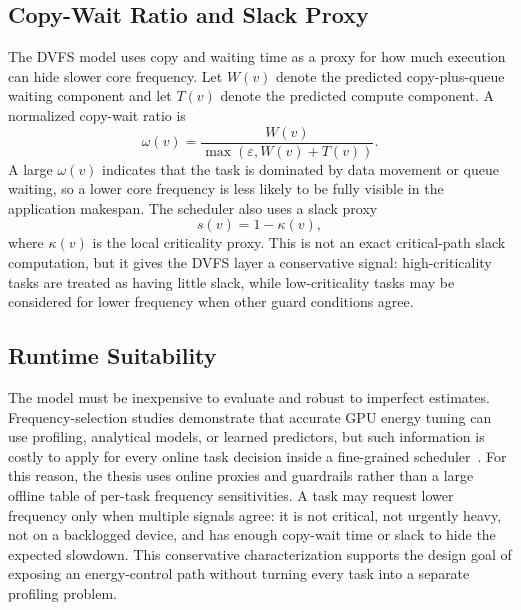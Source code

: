 \subsection{Copy-Wait Ratio and Slack Proxy}
\label{subsec:copy_wait_slack_proxy}

The DVFS model uses copy and waiting time as a proxy for how much execution can hide slower core frequency. Let $W(v)$ denote the predicted copy-plus-queue waiting component and let $T(v)$ denote the predicted compute component. A normalized copy-wait ratio is
\begin{equation}
\omega(v) =
\frac{W(v)}{\max(\varepsilon, W(v)+T(v))}.
\label{eq:copy_wait_ratio}
\end{equation}
A large $\omega(v)$ indicates that the task is dominated by data movement or queue waiting, so a lower core frequency is less likely to be fully visible in the application makespan. The scheduler also uses a slack proxy
\begin{equation}
s(v)=1-\kappa(v),
\label{eq:slack_proxy}
\end{equation}
where $\kappa(v)$ is the local criticality proxy. This is not an exact critical-path slack computation, but it gives the DVFS layer a conservative signal: high-criticality tasks are treated as having little slack, while low-criticality tasks may be considered for lower frequency when other guard conditions agree.

\subsection{Runtime Suitability}
\label{subsec:runtime_suitability}

The model must be inexpensive to evaluate and robust to imperfect estimates. Frequency-selection studies demonstrate that accurate GPU energy tuning can use profiling, analytical models, or learned predictors, but such information is costly to apply for every online task decision inside a fine-grained scheduler~\cite{Ali2022Optimal,Ali2023Portable,Wang2020FreqScaling,Fan2019Predictable}. For this reason, the thesis uses online proxies and guardrails rather than a large offline table of per-task frequency sensitivities. A task may request lower frequency only when multiple signals agree: it is not critical, not urgently heavy, not on a backlogged device, and has enough copy-wait time or slack to hide the expected slowdown. This conservative characterization supports the design goal of exposing an energy-control path without turning every task into a separate profiling problem.

